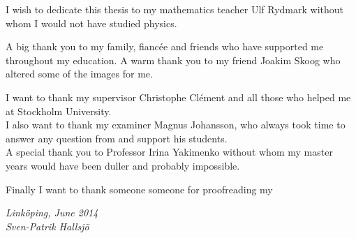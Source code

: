 \begin{acknowledgments}
I wish to dedicate this thesis to my mathematics teacher Ulf Rydmark without whom I would not have studied physics.

A big thank you to my family, fiancée and friends who have supported me throughout my education. A warm thank you to my friend Joakim Skoog who altered some of the images for me.


I want to thank my supervisor Christophe Clément and all those who helped me at Stockholm University. \\
I also want to thank my examiner Magnus Johansson, who always took time to answer any question from and support his students. \\ 
A special thank you to Professor Irina Yakimenko without whom my master years would have been duller and probably impossible.


Finally I want to thank someone someone for proofreading my

  \addvspace{1em}
  \begin{flushright}
    \textit{%
      Linköping, June 2014\\
      Sven-Patrik Hallsjö%
    }
  \end{flushright}
\end{acknowledgments}
